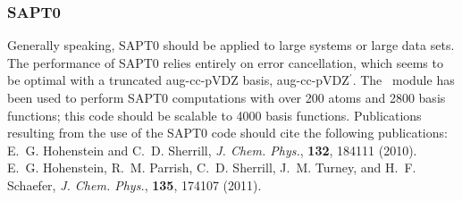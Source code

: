 \subsubsection{SAPT0}

Generally speaking, SAPT0 should be applied to large systems or large data
sets. The performance of SAPT0 relies entirely on error cancellation, which
seems to be optimal with a truncated aug-cc-pVDZ basis, aug-cc-pVDZ$^\prime$.
The \PSIsapt\ module has been used to perform SAPT0 computations with over
200 atoms and 2800 basis functions; this code should be scalable to 4000
basis functions. Publications resulting from the use of the SAPT0 code 
should cite the following publications: \\[10pt]
E.~G. Hohenstein and C.~D. Sherrill, 
{\em J. Chem. Phys.}, {\bf 132}, 184111 (2010). \\[10pt]
E.~G. Hohenstein, R.~M. Parrish, C.~D. Sherrill, J.~M. Turney, and H.~F.
Schaefer, {\em J. Chem. Phys.}, {\bf 135}, 174107 (2011). 

